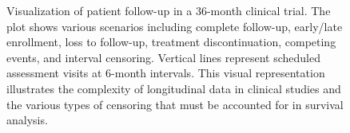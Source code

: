 \begin{figure}[htbp]
    \caption{Visualization of patient follow-up in a 36-month clinical trial. The plot shows various scenarios including complete follow-up, early/late enrollment, loss to follow-up, treatment discontinuation, competing events, and interval censoring. Vertical lines represent scheduled assessment visits at 6-month intervals. This visual representation illustrates the complexity of longitudinal data in clinical studies and the various types of censoring that must be accounted for in survival analysis.}
    \label{fig:clinical-censoring}
\end{figure}

